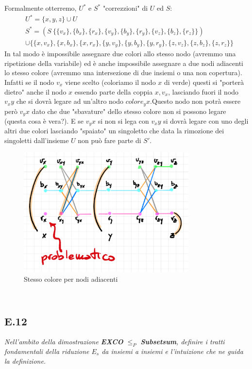 \documentclass[a4paper]{article}
\begin{document}
Formalmente otterremo, $U^*$ e $S^*$ "correzzioni" di $U$ ed $S$:
\begin{align*}
&	U^* = \{x, y, z\} \cup U \\
& 	S^* = (S \ \{\{v_x\}, \{b_x\}, \{r_x\}, \{v_y\}, \{b_y\}, \{r_y\}, \{v_z\}, \{b_z\}, \{r_z\}\}) \\
&	\cup \{\{x, v_x\}, \{x, b_x\}, \{x, r_x\}, \{y, v_y\}, \{y, b_y\}, \{y, r_y\}, \{z, v_z\}, \{z, b_z\}, \{z, r_z\}\}
\end{align*}
In tal modo è impossibile assegnare due colori allo stesso nodo (avremmo una ripetizione della variabile) ed è anche impossibile assegnare a due nodi adiacenti lo stesso colore (avremmo una intersezione di due insiemi o una non copertura).
Infatti se il nodo $v_x$ viene scelto (coloriamo il nodo $x$ di verde) questi si "porterà dietro" anche il nodo $x$ essendo parte della coppia ${x,v_x}$, lasciando fuori il nodo $v_xy$ che si dovrà legare ad un'altro nodo $colore_yx$.Questo nodo non potrà essere però $v_yx$ dato che due "sbavature" dello stesso colore non si possono legare (questa cosa è vera?).
E se $v_yx$ si non si lega con $v_xy$ si dovrà legare con uno degli altri due colori lasciando "spaiato" un singoletto che data la rimozione dei singoletti dall'insieme $U$ non può fare parte di $S'$.
\begin{figure}[!ht]
                \centering
                \includegraphics[width = 0.8\textwidth]{./img/E11_sameCol.png}
                \caption{Stesso colore per nodi adiacenti} \label{FIG:E11_sameCol}
\end{figure}\\



\subsection{E.12}
\emph{Nell’ambito della dimostrazione \textbf{EXCO} $\leq_P$ \textbf{Subsetsum}, definire i tratti fondamentali della riduzione $E_s$ da insiemi a insiemi e l’intuizione che ne guida la definizione.}
\end{document}

